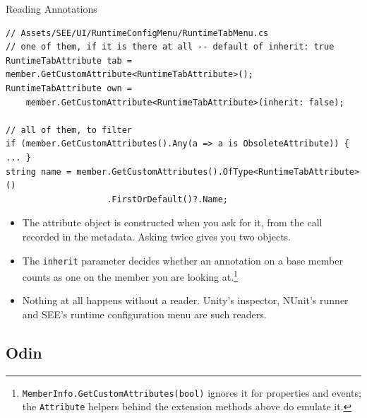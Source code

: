 \begin{frame}[fragile]{Reading Annotations}
  \begin{lstlisting}[basicstyle=\scriptsize\ttfamily]
// Assets/SEE/UI/RuntimeConfigMenu/RuntimeTabMenu.cs
// one of them, if it is there at all -- default of inherit: true
RuntimeTabAttribute tab = member.GetCustomAttribute<RuntimeTabAttribute>();
RuntimeTabAttribute own =
    member.GetCustomAttribute<RuntimeTabAttribute>(inherit: false);

// all of them, to filter
if (member.GetCustomAttributes().Any(a => a is ObsoleteAttribute)) { ... }
string name = member.GetCustomAttributes().OfType<RuntimeTabAttribute>()
                    .FirstOrDefault()?.Name;
  \end{lstlisting}

  \begin{itemize}
    \item The attribute object is constructed when you ask for it, from the
      call recorded in the metadata. Asking twice gives you two objects.
    \item The \texttt{inherit} parameter decides whether an annotation on a
      base member counts as one on the member you are looking
      at.\footnote{\texttt{MemberInfo.GetCustomAttributes(bool)} ignores it for
      properties and events; the \texttt{Attribute} helpers behind the
      extension methods above do emulate it.}
    \item Nothing at all happens without a reader. Unity's inspector, NUnit's
      runner and SEE's runtime configuration menu are such readers.
  \end{itemize}
\end{frame}

\subsection{Odin}


